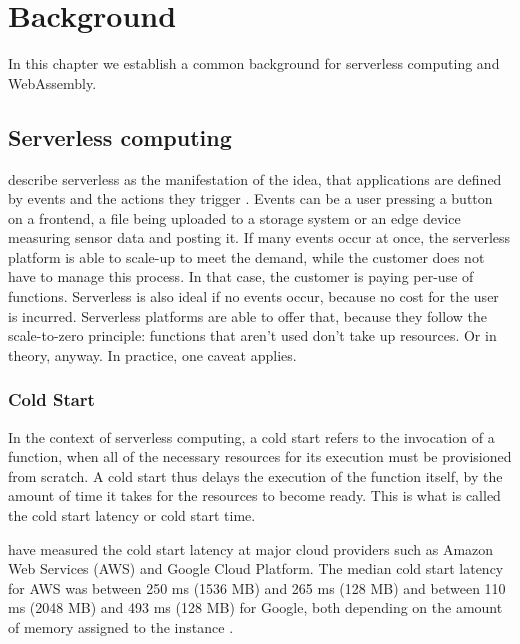 \chapter{Background}
\label{chapter:background}

In this chapter we establish a common background for serverless computing and WebAssembly.

\section{Serverless computing}

\begin{quote}
\end{quote}

\citeauthor{McGrath2017} describe serverless as the manifestation of the idea, that applications are defined by events and the actions they trigger \cite{McGrath2017}. Events can be a user pressing a button on a frontend, a file being uploaded to a storage system or an edge device measuring sensor data and posting it. If many events occur at once, the serverless platform is able to scale-up to meet the demand, while the customer does not have to manage this process. In that case, the customer is paying per-use of functions. Serverless is also ideal if no events occur, because no cost for the user is incurred. Serverless platforms are able to offer that, because they follow the scale-to-zero principle: functions that aren't used don't take up resources. Or in theory, anyway. In practice, one caveat applies.


\subsection{Cold Start}

In the context of serverless computing, a cold start refers to the invocation of a function, when all of the necessary resources for its execution must be provisioned from scratch. A cold start thus delays the execution of the function itself, by the amount of time it takes for the resources to become ready. This is what is called the cold start latency or cold start time.

\citeauthor{Wang2018} have measured the cold start latency at major cloud providers such as Amazon Web Services (AWS) and Google Cloud Platform. The median cold start latency for AWS was between 250 ms (1536 MB) and 265 ms (128 MB) and between 110 ms (2048 MB) and 493 ms (128 MB) for Google, both depending on the amount of memory assigned to the instance \cite{Wang2018}.

